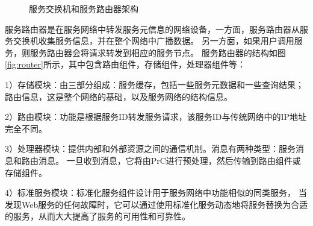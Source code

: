  \begin{figure}[htbp]
    \caption{服务交换机和服务路由器架构}
    \label{fig:switchboardAndRouter}
    \end{figure}


    服务路由器是在服务网络中转发服务元信息的网络设备，一方面，服务路由器从服务交换机收集服务信息，并在整个网络中广播数据。 
    另一方面，如果用户调用服务，则服务路由器会将请求转发到相应的服务节点。 
    服务路由器的结构如图\ref{fig:router}所示，其中包含路由组件，存储组件，处理器组件等：

    1）存储模块：由三部分组成：服务缓存，包括一些服务元数据和一些查询结果；
    路由信息，这是整个网络的基础，以及服务网络的结构信息。
    
    2）路由模块：功能是根据服务ID转发服务请求，该服务ID与传统网络中的IP地址完全不同。
    
    3）处理器模块：提供内部和外部资源之间的通信机制。消息有两种类型：服务消息和路由消息。
    一旦收到消息，它将由PrC进行预处理，然后传输到路由组件或存储组件。
    
    4）标准服务模块：标准化服务组件设计用于服务网络中功能相似的同类服务，
    当发现Web服务的任何故障时，它可以通过使用标准化服务动态地将服务替换为合适的服务，从而大大提高了服务的可用性和可靠性。


